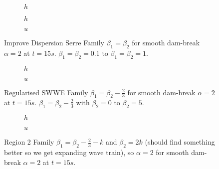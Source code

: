 \documentclass[10pt]{article}
\begin{document}
\begin{figure}
	\centering
	\begin{subfigure}{0.49\textwidth}
		\centering
		
		\caption{$h$}
	\end{subfigure}
	\begin{subfigure}{0.49\textwidth}
		\centering
		
		\caption{$h$}
	\end{subfigure}
	\begin{subfigure}{0.49\textwidth}
		\centering
		
		\caption{$u$}
	\end{subfigure}
	\caption{Improve Dispersion Serre Family $\beta_1 = \beta_2$ for smooth dam-break $\alpha = 2$ at $t=15s$. $\beta_1 =\beta_2 = 0.1$ to $\beta_1 =\beta_2 = 1$. }
\end{figure}

\begin{figure}
	\centering
	\begin{subfigure}{0.49\textwidth}
		\centering
		
		\caption{$h$}
	\end{subfigure}
	\begin{subfigure}{0.49\textwidth}
		\centering
		
		\caption{$u$}
	\end{subfigure}
	\caption{Regularised SWWE Family $\beta_1 = \beta_2 - \frac{2}{3}$ for smooth dam-break $\alpha = 2$ at $t=15s$. $\beta_1 = \beta_2 - \frac{2}{3}$ with  $\beta_2 = 0$ to $\beta_2 = 5$. }
\end{figure}

\begin{figure}
	\centering
	\begin{subfigure}{0.49\textwidth}
		\centering
		
		\caption{$h$}
	\end{subfigure}
	\begin{subfigure}{0.49\textwidth}
		\centering
		
		\caption{$u$}
	\end{subfigure}
	\caption{Region 2 Family $\beta_1 = \beta_2 - \frac{2}{3} - k$ and $\beta_2 = 2k$ (should find something better so we get expanding wave train), so $\alpha = 2$ for smooth dam-break $\alpha = 2$ at $t=15s$.  }
\end{figure}
\end{document}
